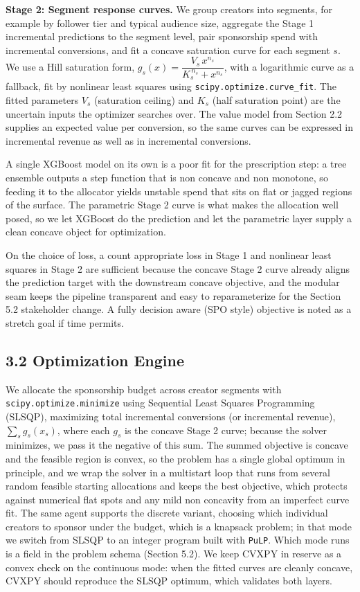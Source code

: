\documentclass[11pt]{article}
\begin{document}
\textbf{Stage 2: Segment response curves.} We group creators into segments, for example by follower tier and typical audience size, aggregate the Stage 1 incremental predictions to the segment level, pair sponsorship spend with incremental conversions, and fit a concave saturation curve for each segment $s$. We use a Hill saturation form, $g_s(x) = \dfrac{V_s\, x^{n_s}}{K_s^{\,n_s} + x^{n_s}}$, with a logarithmic curve as a fallback, fit by nonlinear least squares using \texttt{scipy.optimize.curve\_fit}. The fitted parameters $V_s$ (saturation ceiling) and $K_s$ (half saturation point) are the uncertain inputs the optimizer searches over. The value model from Section 2.2 supplies an expected value per conversion, so the same curves can be expressed in incremental revenue as well as in incremental conversions.

A single XGBoost model on its own is a poor fit for the prescription step: a tree ensemble outputs a step function that is non concave and non monotone, so feeding it to the allocator yields unstable spend that sits on flat or jagged regions of the surface. The parametric Stage 2 curve is what makes the allocation well posed, so we let XGBoost do the prediction and let the parametric layer supply a clean concave object for optimization.

On the choice of loss, a count appropriate loss in Stage 1 and nonlinear least squares in Stage 2 are sufficient because the concave Stage 2 curve already aligns the prediction target with the downstream concave objective, and the modular seam keeps the pipeline transparent and easy to reparameterize for the Section 5.2 stakeholder change. A fully decision aware (SPO style) objective is noted as a stretch goal if time permits.

\subsection*{3.2 \; Optimization Engine}

We allocate the sponsorship budget across creator segments with \texttt{scipy.optimize.minimize} using Sequential Least Squares Programming (SLSQP), maximizing total incremental conversions (or incremental revenue), $\sum_s g_s(x_s)$, where each $g_s$ is the concave Stage 2 curve; because the solver minimizes, we pass it the negative of this sum. The summed objective is concave and the feasible region is convex, so the problem has a single global optimum in principle, and we wrap the solver in a multistart loop that runs from several random feasible starting allocations and keeps the best objective, which protects against numerical flat spots and any mild non concavity from an imperfect curve fit. The same agent supports the discrete variant, choosing which individual creators to sponsor under the budget, which is a knapsack problem; in that mode we switch from SLSQP to an integer program built with \texttt{PuLP}. Which mode runs is a field in the problem schema (Section 5.2). We keep CVXPY in reserve as a convex check on the continuous mode: when the fitted curves are cleanly concave, CVXPY should reproduce the SLSQP optimum, which validates both layers.
\end{document}
